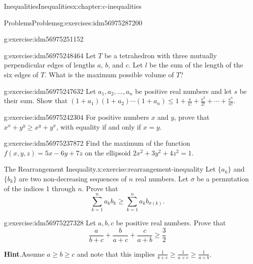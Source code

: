 \documentclass[twoside,10pt,]{book}
\newcommand{\blocktitlefont}{\relax}
\numberwithin{equation}{section}
\begin{document}
\begin{chapterptx}{Inequalities}{}{Inequalities}{}{}{x:chapter:c-inequalities}
\begin{exercises-section}{Problems}{}{Problems}{}{}{g:exercises:idm56975287200}
\begin{divisionexercise}{8}{}{}{g:exercise:idm56975251152}
%
\end{divisionexercise}%
\begin{divisionexercise}{9}{}{}{g:exercise:idm56975248464}%
Let \(T\) be a tetrahedron with three mutually perpendicular edges of lengths \(a\), \(b\), and \(c\).  Let \(l\) be the sum of the length of the six edges of \(T\).  What is the maximum possible volume of \(T\)?%
\end{divisionexercise}%
\begin{divisionexercise}{10}{}{}{g:exercise:idm56975247632}%
Let \(a_1, a_2, \ldots  , a_n\) be positive real numbers and let \(s\) be their sum.  Show that \(\left(1+a_1\right)\left(1+a_2\right)\cdots \left(1+a_n\right) \leq  1 + \frac{s}{1!}+ \frac{s^2}{2!}+ \cdots +\frac{s^n}{n!}\).%
\end{divisionexercise}%
\begin{divisionexercise}{11}{}{}{g:exercise:idm56975242304}%
For positive numbers \(x\) and \(y\), prove that \(x^x+y^y\geq x^y+ y^x\), with equality if and only if \(x=y\).%
\end{divisionexercise}%
\begin{divisionexercise}{12}{}{}{g:exercise:idm56975237872}%
Find the maximum of the function \(f(x,y,z)=5x -6y+7z\) on the ellipsoid \(2x^2+3y^2+4z^2=1\).%
\end{divisionexercise}%
\begin{divisionexercise}{13}{The Rearrangement Inequality.}{}{x:exercise:rearrangement-inequality}%
%
Let \(\{a_k\}\) and \(\{b_k\}\) are two non-decreasing sequences of \(n\) real numbers.  Let \(\sigma\) be a permutation of the indices 1 through \(n\).  Prove that%
\begin{equation*}
\sum_{k=1}^n a_k b_k \ge \sum_{k=1}^n a_k b_{\sigma(k)}.
\end{equation*}
%
\end{divisionexercise}%
\begin{divisionexercise}{14}{}{}{g:exercise:idm56975227328}%
Let \(a, b, c\) be positive real numbers.  Prove that%
\begin{equation*}
\frac{a}{b+c} + \frac{b}{a+c}+ \frac{c}{a+b} \ge \frac{3}{2}
\end{equation*}
%
\par\smallskip%
\noindent\textbf{\blocktitlefont Hint}.\hypertarget{g:hint:idm56975225376}{}\quad{}Assume \(a \ge b \ge c\) and note that this implies \(\frac{1}{b+c} \ge \frac{1}{a+c} \ge \frac{1}{a+b}\).%
\end{divisionexercise}%
\end{exercises-section}
\end{chapterptx}
\end{document}
